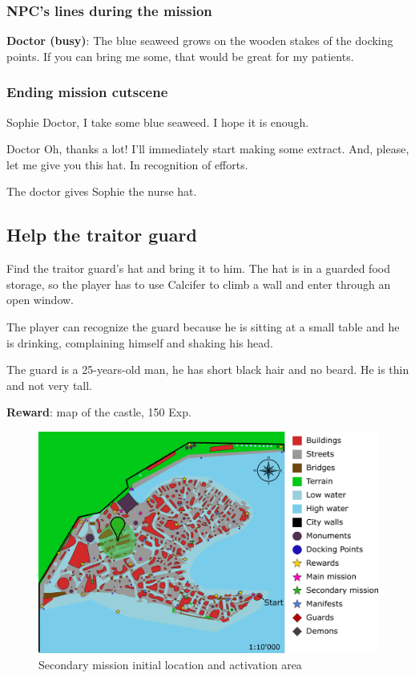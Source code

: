 \subsubsection*{NPC's lines during the mission}
\textbf{Doctor (busy)}: The blue seaweed grows on the wooden stakes of the docking points. If you can bring me some, that would be great for my patients.

\subsubsection*{Ending mission cutscene}
\begin{screenplay}

\begin{dialogue}{Sophie}
Doctor, I take some blue seaweed. I hope it is enough.
\end{dialogue}

\begin{dialogue}{Doctor}
Oh, thanks a lot! I'll immediately start making some extract. And, please, let me give you this hat. In recognition of efforts.
\end{dialogue}

The doctor gives Sophie the nurse hat.

\end{screenplay}


\subsection{Help the traitor guard}
Find the traitor guard's hat and bring it to him. The hat is in a guarded food storage, so the player has to use Calcifer to climb a wall and enter through an open window.

The player can recognize the guard because he is sitting at a small table and he is drinking, complaining himself and shaking his head.

The guard is a 25-years-old man, he has short black hair and no beard. He is thin and not very tall.

\textbf{Reward}: map of the castle, 150 Exp.

\begin{figure}[H]
  \centering
  \includegraphics[width=\textwidth]{../Images/Maps/dynamiaSecondaryMissions_Guard}
  \caption{Secondary mission initial location and activation area}
\end{figure}

